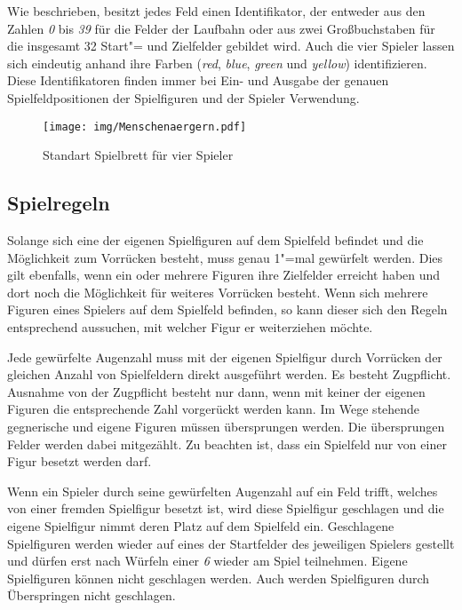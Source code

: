 Wie beschrieben, besitzt jedes Feld einen Identifikator, der entweder aus den Zahlen \emph{0} bis \emph{39} für die Felder der Laufbahn oder aus zwei Großbuchstaben für die insgesamt 32 Start"= und Zielfelder gebildet wird. Auch die vier Spieler lassen sich eindeutig anhand ihre Farben (\emph{red}, \emph{blue}, \emph{green} und \emph{yellow}) identifizieren. Diese Identifikatoren finden immer bei Ein- und Ausgabe der genauen Spielfeldpositionen der Spielfiguren und der Spieler Verwendung.

\begin{figure}[h!]
\centering
\texttt{[image: img/Menschenaergern.pdf]}
\caption{Standart Spielbrett für vier Spieler\label{fig:Menschenaergern}}
\end{figure}

\subsection*{Spielregeln}
Solange sich eine der eigenen Spielfiguren auf dem Spielfeld befindet und die Möglichkeit zum Vorrücken besteht, muss genau 1"=mal gewürfelt werden. Dies gilt ebenfalls, wenn ein oder mehrere Figuren ihre Zielfelder erreicht haben und dort noch die Möglichkeit für weiteres Vorrücken besteht. Wenn sich mehrere Figuren eines Spielers auf dem Spielfeld befinden, so kann dieser sich den Regeln entsprechend aussuchen, mit welcher Figur er weiterziehen möchte.

Jede gewürfelte Augenzahl muss mit der eigenen Spielfigur durch Vorrücken der gleichen Anzahl von Spielfeldern direkt ausgeführt werden. Es besteht Zugpflicht. Ausnahme von der Zugpflicht besteht nur dann, wenn mit keiner der eigenen Figuren die entsprechende Zahl vorgerückt werden kann. Im Wege stehende gegnerische und eigene Figuren müssen übersprungen werden. Die übersprungen Felder werden dabei mitgezählt. Zu beachten ist, dass ein Spielfeld nur von einer Figur besetzt werden darf.

Wenn ein Spieler durch seine gewürfelten Augenzahl auf ein Feld trifft, welches von einer fremden Spielfigur besetzt ist, wird diese Spielfigur geschlagen und die eigene Spielfigur nimmt deren Platz auf dem Spielfeld ein. Geschlagene Spielfiguren werden wieder auf eines der Startfelder des jeweiligen Spielers gestellt und dürfen erst nach Würfeln einer \emph{6} wieder am Spiel teilnehmen. Eigene Spielfiguren können nicht geschlagen werden. Auch werden Spielfiguren durch Überspringen nicht geschlagen.

